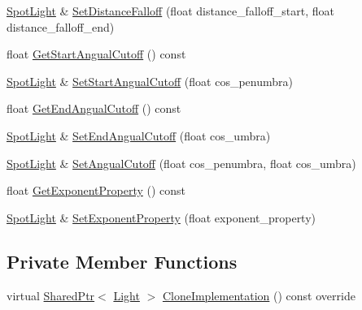 \begin{DoxyCompactItemize}
\item 
\hyperlink{classmage_1_1_spot_light}{Spot\+Light} \& \hyperlink{classmage_1_1_spot_light_a7321dc4bef165fbaaf9cf4b5781bc00f}{Set\+Distance\+Falloff} (float distance\+\_\+falloff\+\_\+start, float distance\+\_\+falloff\+\_\+end)
\item 
float \hyperlink{classmage_1_1_spot_light_abe143425da28281b7b72643bd2f1c5c2}{Get\+Start\+Angual\+Cutoff} () const
\item 
\hyperlink{classmage_1_1_spot_light}{Spot\+Light} \& \hyperlink{classmage_1_1_spot_light_a9ba061c92fda73430ba268a99a8d3ef6}{Set\+Start\+Angual\+Cutoff} (float cos\+\_\+penumbra)
\item 
float \hyperlink{classmage_1_1_spot_light_ac04202c48cb4c12334f9f55757a3d73a}{Get\+End\+Angual\+Cutoff} () const
\item 
\hyperlink{classmage_1_1_spot_light}{Spot\+Light} \& \hyperlink{classmage_1_1_spot_light_ae89a7a3cdc11ed0f9d2aa825fcf0a07a}{Set\+End\+Angual\+Cutoff} (float cos\+\_\+umbra)
\item 
\hyperlink{classmage_1_1_spot_light}{Spot\+Light} \& \hyperlink{classmage_1_1_spot_light_a128e9e0b9a720f92d16ddd6ca4c31d18}{Set\+Angual\+Cutoff} (float cos\+\_\+penumbra, float cos\+\_\+umbra)
\item 
float \hyperlink{classmage_1_1_spot_light_aaff34ca166a8a129f461579869803aaa}{Get\+Exponent\+Property} () const
\item 
\hyperlink{classmage_1_1_spot_light}{Spot\+Light} \& \hyperlink{classmage_1_1_spot_light_a5a53acd29a7796a16459284dc24b9044}{Set\+Exponent\+Property} (float exponent\+\_\+property)
\end{DoxyCompactItemize}
\subsection*{Private Member Functions}
\begin{DoxyCompactItemize}
\item 
virtual \hyperlink{namespacemage_a1e01ae66713838a7a67d30e44c67703e}{Shared\+Ptr}$<$ \hyperlink{classmage_1_1_light}{Light} $>$ \hyperlink{classmage_1_1_spot_light_a28af107205b30f115b5b722ea45bf366}{Clone\+Implementation} () const override
\end{DoxyCompactItemize}
